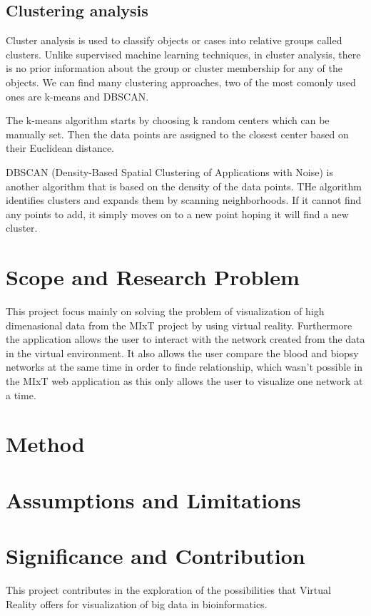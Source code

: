 \subsection{Clustering analysis}
Cluster analysis is used to classify objects or cases into relative groups called clusters. Unlike supervised machine learning techniques, in cluster analysis, there is no prior information about the group or cluster membership for any of the objects. We can find many clustering approaches, two of the most comonly used ones are k-means and DBSCAN.

The k-means algorithm starts by choosing k random centers which can be manually set. Then the data points are assigned to the closest center based on their Euclidean distance.

DBSCAN (Density-Based Spatial Clustering of Applications with Noise) is another algorithm that is based on the density of the data points. THe algorithm identifies clusters and expands them by scanning neighborhoods. If it cannot find any points to add, it simply moves on to a new point hoping it will find a new cluster.

\section{Scope and Research Problem}
This project focus mainly on solving the problem of visualization of high dimenasional data from the MIxT project by using virtual reality. Furthermore the application allows the user to interact with the network created from the data in the virtual environment. It also allows the user compare the blood and biopsy networks at the same time in order to finde relationship, which wasn't possible in the MIxT web application as this only allows the user to visualize one network at a time.

\section{Method}

\section{Assumptions and Limitations}

\section{Significance and Contribution}
This project contributes in the exploration of the possibilities that Virtual Reality offers for visualization of big data in bioinformatics.
